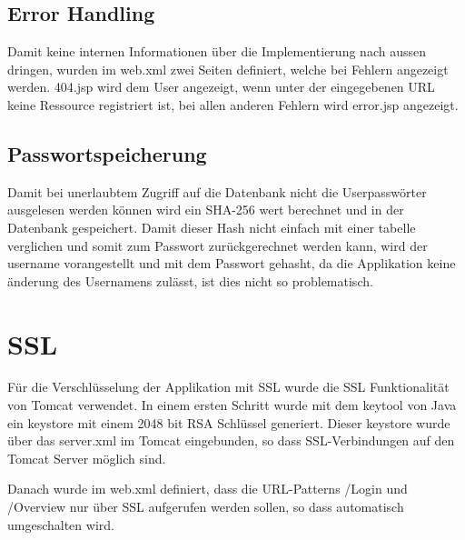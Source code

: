 \documentclass[12pt]{scrartcl}
\begin{document}
\subsection{Error Handling}
Damit keine internen Informationen über die Implementierung nach aussen dringen, wurden im web.xml zwei Seiten definiert, welche bei Fehlern angezeigt werden. 404.jsp wird dem User angezeigt, wenn unter der eingegebenen URL keine Ressource registriert ist, bei allen anderen Fehlern wird error.jsp angezeigt.

\subsection{Passwortspeicherung}
Damit bei unerlaubtem Zugriff auf die Datenbank nicht die Userpasswörter ausgelesen werden können wird ein SHA-256 wert berechnet und in der Datenbank gespeichert. Damit dieser Hash nicht einfach mit einer tabelle verglichen und somit zum Passwort zurückgerechnet werden kann, wird der username vorangestellt und mit dem Passwort gehasht, da die Applikation keine änderung des Usernamens zulässt, ist dies nicht so problematisch.
\section{SSL}
Für die Verschlüsselung der Applikation mit SSL wurde die SSL Funktionalität von Tomcat verwendet.
In einem ersten Schritt wurde mit dem keytool von Java ein keystore mit einem 2048 bit RSA Schlüssel generiert. Dieser keystore wurde über das server.xml im Tomcat eingebunden, so dass SSL-Verbindungen auf den Tomcat Server möglich sind.

Danach wurde im web.xml definiert, dass die URL-Patterns /Login und /Overview nur über SSL aufgerufen werden sollen, so dass automatisch umgeschalten wird.

\end{document}
